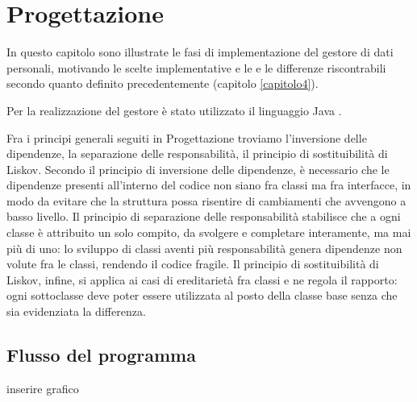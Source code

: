 \chapter{Progettazione}
\label{capitolo5}
\thispagestyle{empty}

\noindent In questo capitolo sono illustrate le fasi di implementazione del gestore di dati personali, motivando le scelte implementative e le e le differenze riscontrabili secondo quanto definito precedentemente (capitolo \ref{capitolo4}).

Per la realizzazione del gestore \`e stato utilizzato il linguaggio Java\cite{javalanguagespecs} \cite{java8api}.

Fra i principi generali seguiti in Progettazione troviamo l’inversione delle dipendenze, la separazione delle responsabilit\`a, il principio di sostituibilit\`a di Liskov. Secondo il principio di inversione delle dipendenze, \`e necessario che le dipendenze presenti all’interno del codice non siano fra classi ma fra interfacce, in modo da evitare che la struttura possa risentire di cambiamenti che avvengono a basso livello. Il principio di separazione delle responsabilit\`a stabilisce che a ogni classe \`e attribuito un solo compito, da svolgere e completare interamente, ma mai pi\`u di uno: lo sviluppo di classi aventi pi\`u responsabilit\`a genera dipendenze non volute fra le classi, rendendo il codice fragile. Il principio di sostituibilit\`a di Liskov, infine, si applica ai casi di ereditariet\`a fra classi e ne regola il rapporto: ogni sottoclasse deve poter essere utilizzata al posto della classe base senza che sia evidenziata la differenza.

\section{Flusso del programma}
inserire grafico

